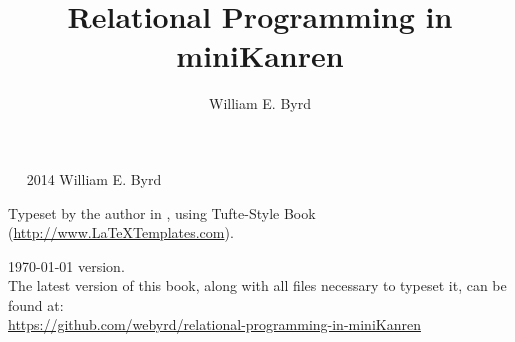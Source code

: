 \documentclass[nols]{tufte-book}
\title{Relational Programming in miniKanren}
\author{William E. Byrd}
\newcommand{\blankpage}{\newpage\hbox{}\thispagestyle{empty}\newpage} %
\begin{document}
\begin{schemeregion}

\frontmatter



\renewcommand{\maketitlepage}[0]{%
  \cleardoublepage%
  {%
  \rmfamily%
  \begin{fullwidth}%
  \fontsize{36}{38}\selectfont\par\noindent\textcolor{darkgray}{Relational Programming\\\noindent in miniKanren}%
  \vspace{3pc}%
  \sffamily%
  \fontsize{20}{22}\selectfont\par\noindent\textcolor{darkgray}{\allcaps{\thanklessauthor}}%
  \vfill%
  \fontsize{14}{16}\selectfont\par\noindent\allcaps{\thanklesspublisher}%
  \end{fullwidth}%
  }

  \thispagestyle{empty}%
  \clearpage%
}

\maketitle %

\blankpage

\blankpage

\blankpage

\blankpage

\blankpage




\newpage

\begin{fullwidth}
~\vfill
\thispagestyle{empty}
\setlength{\parindent}{0pt}
\setlength{\parskip}{\baselineskip}
\large
\noindent
\textcopyright~2014 William E. Byrd

\noindent
Typeset by the author in \XeLaTeX, using Tufte-Style Book (\url{http://www.LaTeXTemplates.com}).

\today\xspace version. \\ The latest version of this book, along with all files necessary to typeset it, can be found at: \\ \url{https://github.com/webyrd/relational-programming-in-miniKanren}


\end{fullwidth}
\end{schemeregion}
\end{document}
